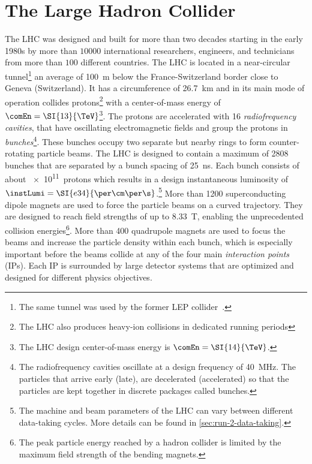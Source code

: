 \section{The Large Hadron Collider}
The LHC was designed and built for more than two decades starting in the early 1980s by more than $10000$ international researchers, engineers, and technicians from more than $100$ different countries.
The LHC is located in a near-circular tunnel\footnote{The same tunnel was used by the former LEP collider~\cite{LEPDesignReport}.} an average of \SI{100}{\m} below the France-Switzerland border close to Geneva (Switzerland). It has a circumference of \SI{26.7}{\km} and in its main mode of operation collides protons\footnote{The LHC also produces heavy-ion collisions in dedicated running periods} with a center-of-mass energy of $\comEn = \SI{13}{\TeV}$\footnote{The LHC design center-of-mass energy is $\comEn = \SI{14}{\TeV}$.}.
The protons are accelerated with 16 \emph{radiofrequency cavities}, that have oscillating electromagnetic fields and group the protons in \emph{bunches}\footnote{The radiofrequency cavities oscillate at a design frequency of \SI{40}{\mega\hertz}. The particles that arrive early (late), are decelerated (accelerated) so that the particles are kept together in discrete packages called bunches.}.
These bunches occupy two separate but nearby rings to form counter-rotating particle beams.
The LHC is designed to contain a maximum of 2808 bunches that are separated by a bunch spacing of \SI{25}{\ns}. Each bunch consists of about \SI{e11}{protons} which results in a design instantaneous luminosity of $\instLumi = \SI{e34}{\per\cm\per\s}$.\footnote{The machine and beam parameters of the LHC can vary between different data-taking cycles. More details can be found in \cref{sec:run-2-data-taking}.}
More than 1200 superconducting dipole magnets are used to force the particle beams on a curved trajectory.
They are designed to reach field strengths of up to \SI{8.33}{\tesla}, enabling the unprecedented collision energies\footnote{The peak particle energy reached by a hadron collider is limited by the maximum field strength of the bending magnets.}. More than 400 quadrupole magnets are used to focus the beams and increase the particle density within each bunch, which is especially important before the beams collide at any of the four main \emph{interaction points} (IPs). Each IP is surrounded by large detector systems that are optimized and designed for different physics objectives.
